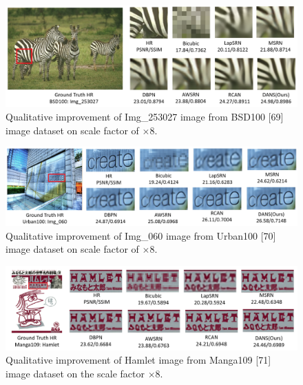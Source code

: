 \documentclass{ieeeaccess}
\begin{document}
\begin{figure}
    \centering

    \includegraphics[width=\linewidth]{22Figure.png}
    \caption{Qualitative improvement of Img\_253027 image from BSD100 [69] image dataset on scale factor of $\times8$.}
    \label{fig:22}
\end{figure}

\begin{figure}
    \centering

    \includegraphics[width=\linewidth]{23Figure.png}
    \caption{Qualitative improvement of Img\_060 image from Urban100 [70] image dataset on scale factor of $\times8$.}
    \label{fig:23}
\end{figure}

\begin{figure}
    \centering

    \includegraphics[width=\linewidth]{24Figure.png}
    \caption{Qualitative improvement of Hamlet image from Manga109 [71] image dataset on the scale factor $\times8$.}
    \label{fig:24}
\end{figure}
\end{document}
